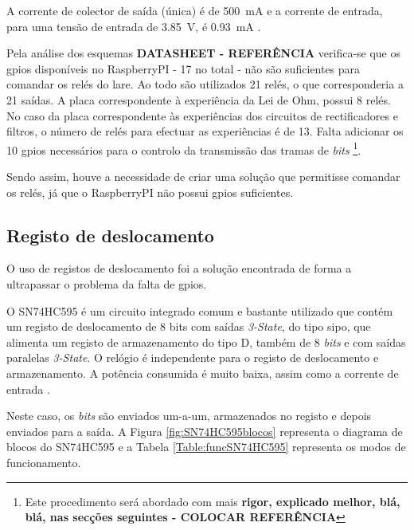 A corrente de colector de saída (única) é de \SI{500}{\mA} e a corrente de entrada, para uma tensão de entrada de \SI{3.85}{\volt}, é \SI{0.93}{\mA} \cite{ULN2003}.

Pela análise dos esquemas \textbf{DATASHEET - REFERÊNCIA} verifica-se que os \acrshort{gpio}s disponíveis no \gls{RaspberryPI} - 17 no total - não são suficientes para comandar os relés do \acrshort{lare}. Ao todo são utilizados 21 relés, o que corresponderia a 21 saídas. A placa correspondente à experiência da Lei de Ohm, possui 8 relés. No caso da placa correspondente às experiências dos circuitos de rectificadores e filtros, o número de relés para efectuar as experiências é de 13. Falta adicionar os 10 \acrshort{gpio}s necessários para o controlo da transmissão das tramas de \textit{bits} \footnote{Este procedimento será abordado com mais \textbf{rigor, explicado melhor, blá, blá, nas secções seguintes - COLOCAR REFERÊNCIA}}.

Sendo assim, houve a necessidade de criar uma solução que permitisse comandar os relés, já que o \gls{RaspberryPI} não possui \acrshort{gpio}s suficientes.

\subsection{Registo de deslocamento}
O uso de registos de deslocamento foi a solução encontrada de forma a ultrapassar o problema da falta de \acrshort{gpio}s.

O SN74HC595 é um circuito integrado comum e bastante utilizado que contém um registo de deslocamento de 8 bits com saídas \textit{3-State}, do tipo \acrfull{sipo}, que alimenta um registo de armazenamento do tipo D, também de 8 \textit{bits} e com saídas paralelas \textit{3-State}. O relógio é independente para o registo de deslocamento e armazenamento. A potência consumida é muito baixa, assim como a corrente de entrada \cite{SN74HC595}.

Neste caso, os \textit{bits} são enviados um-a-um, armazenados no registo e depois enviados para a saída. A Figura \ref{fig:SN74HC595blocos} representa o diagrama de blocos do SN74HC595 e a Tabela \ref{Table:funcSN74HC595} representa os modos de funcionamento.

